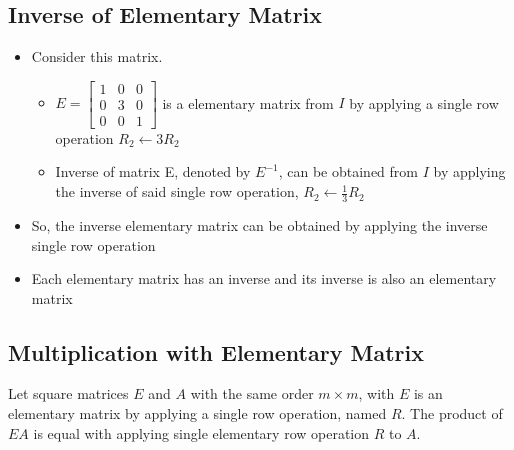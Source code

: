 \documentclass[a4paper,12pt]{article}
\begin{document}
\subsection*{Inverse of Elementary Matrix}
\begin{itemize}
  \item Consider this matrix.
        \begin{itemize}
          \item \(E=\begin{bmatrix}
                  1 & 0 & 0 \\ 0 & 3 & 0 \\ 0 & 0 & 1
                \end{bmatrix}\) is a elementary matrix from \(I\) by applying a single row operation \(R_2 \leftarrow 3R_2\)
          \item Inverse of matrix E, denoted by \(E^{-1}\), can be obtained from \(I\) by applying the inverse of said single row operation, \(R_2 \leftarrow \frac{1}{3}R_2\)
        \end{itemize}
  \item So, the inverse elementary matrix can be obtained by applying the inverse single row operation
  \item Each elementary matrix has an inverse and its inverse is also an elementary matrix
\end{itemize}

\subsection*{Multiplication with Elementary Matrix}
Let square matrices \(E\) and \(A\) with the same order \(m\times m\), with \(E\) is an elementary matrix by applying a single row operation, named \(R\). The product of \(EA\) is equal with applying single elementary row operation \(R\) to \(A\).
\end{document}
